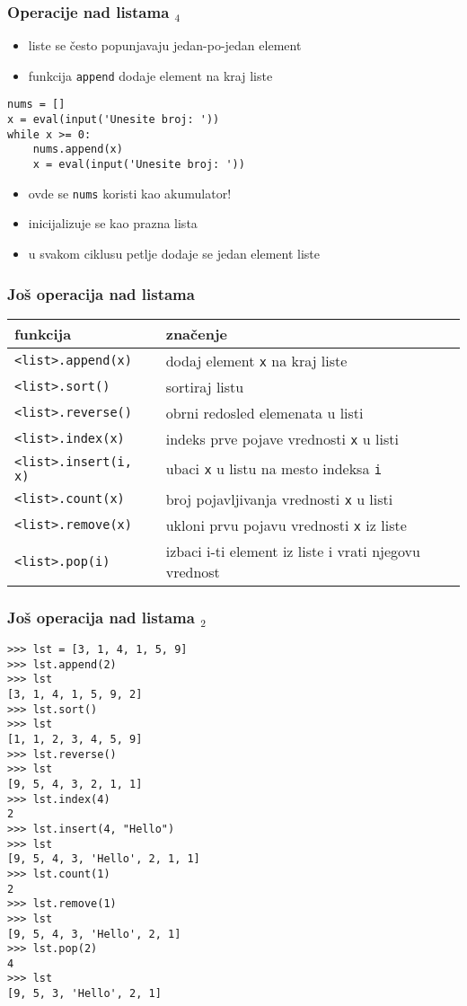 \documentclass[utf8,compress,aspectratio=169]{beamer}
\begin{document}
\begin{frame}[fragile]
  \frametitle{Operacije nad listama $_4$}
  \begin{itemize}
    \item liste se često popunjavaju jedan-po-jedan element
    \item funkcija \texttt{append} dodaje element na kraj liste
  \end{itemize}
\begin{verbatim}
nums = []
x = eval(input('Unesite broj: '))
while x >= 0:
    nums.append(x)
    x = eval(input('Unesite broj: '))
\end{verbatim}
  \begin{itemize}
    \item ovde se \texttt{nums} koristi kao akumulator!
    \item inicijalizuje se kao prazna lista
    \item u svakom ciklusu petlje dodaje se jedan element liste
  \end{itemize}
\end{frame}

\begin{frame}[fragile,shrink=5]
  \frametitle{Još operacija nad listama}
\begin{center}
\begin{tabular}{l|l}
\textbf{funkcija} & \textbf{značenje} \\ \hline
\texttt{<list>.append(x)} & dodaj element \texttt{x} na kraj liste \\
\texttt{<list>.sort()} & sortiraj listu \\
\texttt{<list>.reverse()} & obrni redosled elemenata u listi \\
\texttt{<list>.index(x)} & indeks prve pojave vrednosti \texttt{x} u listi \\
\texttt{<list>.insert(i, x)} & ubaci \texttt{x} u listu na mesto indeksa \texttt{i} \\
\texttt{<list>.count(x)} & broj pojavljivanja vrednosti \texttt{x} u listi \\
\texttt{<list>.remove(x)} & ukloni prvu pojavu vrednosti \texttt{x} iz liste \\
\texttt{<list>.pop(i)} & izbaci i-ti element iz liste i vrati njegovu vrednost
\end{tabular}
\end{center}
\end{frame}

\begin{frame}[fragile,shrink=5]
  \frametitle{Još operacija nad listama $_2$}
\begin{verbatim}
>>> lst = [3, 1, 4, 1, 5, 9]
>>> lst.append(2)
>>> lst
[3, 1, 4, 1, 5, 9, 2]
>>> lst.sort()
>>> lst
[1, 1, 2, 3, 4, 5, 9]
>>> lst.reverse()
>>> lst
[9, 5, 4, 3, 2, 1, 1]
>>> lst.index(4)
2
>>> lst.insert(4, "Hello")
>>> lst
[9, 5, 4, 3, 'Hello', 2, 1, 1]
>>> lst.count(1)
2
>>> lst.remove(1)
>>> lst
[9, 5, 4, 3, 'Hello', 2, 1]
>>> lst.pop(2)
4
>>> lst
[9, 5, 3, 'Hello', 2, 1]
\end{verbatim}
\end{frame}
\end{document}
